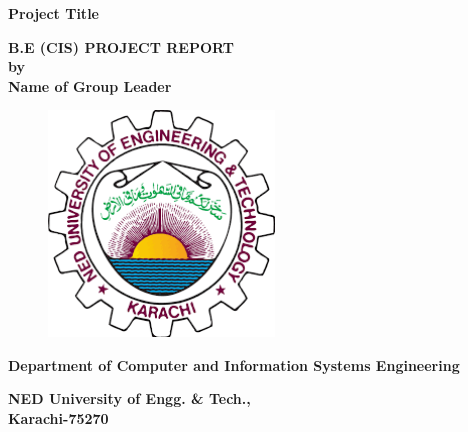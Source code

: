 \begin{titlepage}
  \centering
  {\Large\textbf{Project Title}}
  
  \vspace{4cm}
  {\large\textbf{B.E (CIS) PROJECT REPORT\\ by\\ \vspace{0.5cm} Name of Group Leader}}

  \vspace{2cm}
  \begin{figure}[ht]
    \centering
    \includegraphics[width=6cm]{images/ned_logo.png}
  \end{figure}
  
  \vfill
  \textbf{Department of Computer and Information Systems Engineering}
  \vspace{1cm}

  \textbf{NED University of Engg. \& Tech.,\\
  Karachi-75270}
\end{titlepage}
\clearpage
